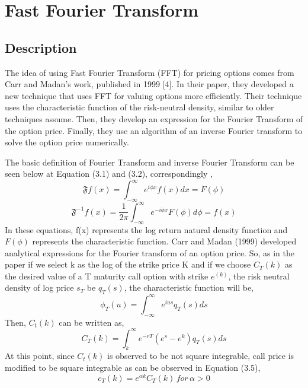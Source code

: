 \documentclass[fontsize=12pt]{article}
\numberwithin{equation}{section} %
\numberwithin{figure}{section} %
\numberwithin{table}{section} %
\begin{document}
\section{Fast Fourier Transform} \label{Fast Fourier Transform}

\subsection{Description} \label{Description2}
	
	The idea of using Fast Fourier Transform (FFT) for pricing options comes from Carr and Madan's work, published in 1999 [4].  In their paper, they developed a new technique that uses FFT for valuing options more efficiently. Their technique uses the characteristic function of the risk-neutral density, similar to older techniques assume. Then, they develop an expression for the Fourier Transform of the option price. Finally, they use an algorithm of an inverse Fourier transform to solve the option price numerically. 

The basic definition of Fourier Transform and inverse Fourier Transform  can be seen below at Equation (3.1) and (3.2), correspondingly ,
\begin{equation}
\mathfrak{F}{f(x)}=\int_{-\infty}^{\infty } e^{i \phi x}f(x)dx=F(\phi)
\end{equation}
\begin{equation}
\mathfrak{F}^{-1}{f(x)}=\dfrac{1}{2\pi} \int_{-\infty}^{\infty } e^{-i \phi x}F(\phi)d\phi=f(x)
\end{equation}
	In these equations, f(x) represents the log return natural density function and $F(\phi)$ represents the characteristic function. Carr and Madan (1999) developed analytical expressions for the  Fourier transform of an option price. So, as in the paper if we select k as the log of the strike price K and if we choose $C_T(k)$ as the desired value of a T maturity call option with strike $e^{(k)}$, the risk neutral density of log price  $s_T$ be $q_T(s)$,  the characteristic function will be,
\begin{equation}
\phi_T(u)=\int_{-\infty}^{\infty } e^{i u s} q_T(s)ds
\end{equation}
Then, $C_t(k)$ can be written as,
\begin{equation}
C_T(k)=\int_{k}^{\infty } e^{-rT} (e^s-e^k) q_T(s)ds
\end{equation}
At this point, since $C_t(k)$ is observed to be not square integrable, call price is modified to be square integrable as can be observed in Equation (3.5),
\begin{equation}
c_T(k)=e^{\alpha k} C_T(k) \, for \,  \alpha>0
\end{equation}
\end{document}
